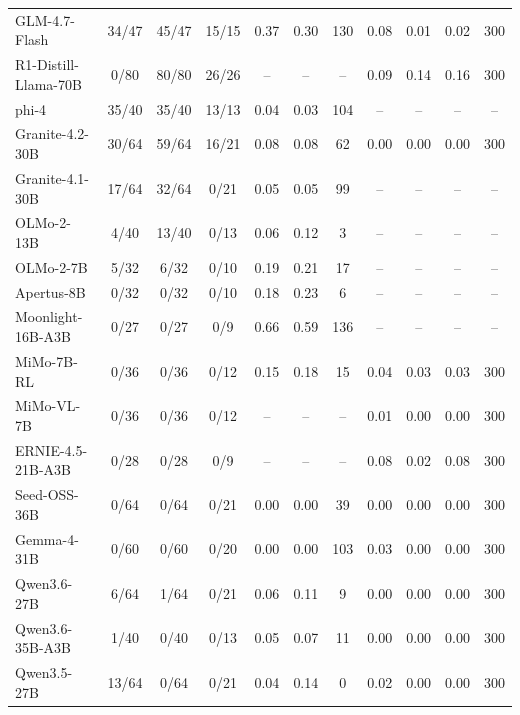 \begin{table}[htbp]
\begin{tabular}{lcccccccccc}
GLM-4.7-Flash & 34/47 & 45/47 & 15/15 & 0.37 & 0.30 & 130 & 0.08 & 0.01 & 0.02 & 300 \\
R1-Distill-Llama-70B & 0/80 & 80/80 & 26/26 & -- & -- & -- & 0.09 & 0.14 & 0.16 & 300 \\
phi-4 & 35/40 & 35/40 & 13/13 & 0.04 & 0.03 & 104 & -- & -- & -- & -- \\
Granite-4.2-30B & 30/64 & 59/64 & 16/21 & 0.08 & 0.08 & 62 & 0.00 & 0.00 & 0.00 & 300 \\
Granite-4.1-30B & 17/64 & 32/64 & 0/21 & 0.05 & 0.05 & 99 & -- & -- & -- & -- \\
OLMo-2-13B & 4/40 & 13/40 & 0/13 & 0.06 & 0.12 & 3 & -- & -- & -- & -- \\
OLMo-2-7B & 5/32 & 6/32 & 0/10 & 0.19 & 0.21 & 17 & -- & -- & -- & -- \\
Apertus-8B & 0/32 & 0/32 & 0/10 & 0.18 & 0.23 & 6 & -- & -- & -- & -- \\
Moonlight-16B-A3B & 0/27 & 0/27 & 0/9 & 0.66 & 0.59 & 136 & -- & -- & -- & -- \\
MiMo-7B-RL & 0/36 & 0/36 & 0/12 & 0.15 & 0.18 & 15 & 0.04 & 0.03 & 0.03 & 300 \\
MiMo-VL-7B & 0/36 & 0/36 & 0/12 & -- & -- & -- & 0.01 & 0.00 & 0.00 & 300 \\
ERNIE-4.5-21B-A3B & 0/28 & 0/28 & 0/9 & -- & -- & -- & 0.08 & 0.02 & 0.08 & 300 \\
Seed-OSS-36B & 0/64 & 0/64 & 0/21 & 0.00 & 0.00 & 39 & 0.00 & 0.00 & 0.00 & 300 \\
Gemma-4-31B & 0/60 & 0/60 & 0/20 & 0.00 & 0.00 & 103 & 0.03 & 0.00 & 0.00 & 300 \\
Qwen3.6-27B & 6/64 & 1/64 & 0/21 & 0.06 & 0.11 & 9 & 0.00 & 0.00 & 0.00 & 300 \\
Qwen3.6-35B-A3B & 1/40 & 0/40 & 0/13 & 0.05 & 0.07 & 11 & 0.00 & 0.00 & 0.00 & 300 \\
Qwen3.5-27B & 13/64 & 0/64 & 0/21 & 0.04 & 0.14 & 0 & 0.02 & 0.00 & 0.00 & 300 \\
\bottomrule
\end{tabular}
\end{table}
